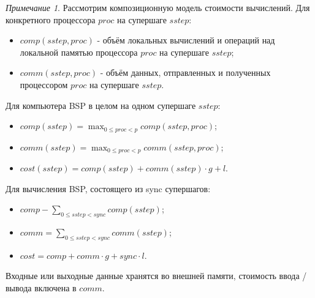 \documentclass[a4paper]{article}
\theoremstyle{indented}
\theoremstyle{definition}
\theoremstyle{remark}
\newtheorem{remark}{Примечание}
\begin{document}
\begin{remark}
    Рассмотрим композиционную модель стоимости вычислений. Для конкретного процессора $proc$ на супершаге $sstep$:

    \begin{itemize}
        \item $comp(sstep, proc)$ - объём локальных вычислений и операций над локальной памятью процессора $proc$ на супершаге $sstep$; 
        \item $comm(sstep, proc)$ - объём данных, отправленных и полученных процессором $proc$ на супершаге $sstep$.
    \end{itemize}

    Для компьютера BSP в целом на одном супершаге $sstep$:

    \begin{itemize}
        \item $comp(sstep)=\max_{0\leq proc < p}comp(sstep, proc)$; 
        \item $comm(sstep)=\max_{0\leq proc <p}comm(sstep, proc)$; 
        \item $cost(sstep)=comp(sstep)+comm(sstep)\cdot g+l$.
    \end{itemize}

    Для вычисления BSP, состоящего из sync супершагов:

    \begin{itemize}
        \item $comp-\sum_{0\leq sstep <sync}comp(sstep)$; 
        \item $comm=\sum_{0\leq sstep < sync}comm(sstep)$; 
        \item $cost = comp+comm\cdot g+sync\cdot l$. 
    \end{itemize}

    Входные или выходные данные хранятся во внешней памяти, стоимость ввода / вывода включена в $comm$.
\end{remark}
\end{document}
